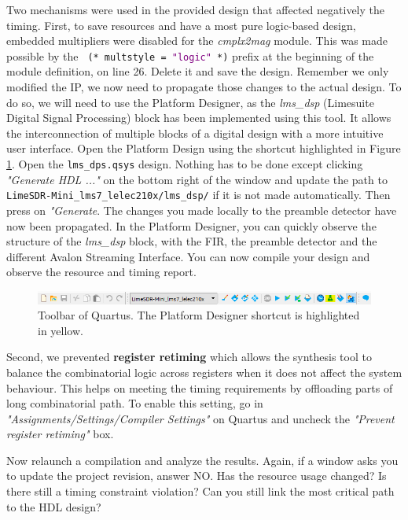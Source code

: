 Two mechanisms were used in the provided design that affected negatively the timing. First, to save resources and have a most pure logic-based design, embedded multipliers were disabled for the \textit{cmplx2mag} module. This was made possible by the \texttt{ (* multstyle = \textcolor{purple}{"logic"} *)} prefix at the beginning of the module definition, on line 26. Delete it and save the design. Remember we only modified the IP, we now need to propagate those changes to the actual design. To do so, we will need to use the Platform Designer, as the \textit{lms\_dsp} (Limesuite Digital Signal Processing) block has been implemented using this tool. It allows the interconnection of multiple blocks of a digital design with a more intuitive user interface. Open the Platform Design using the shortcut highlighted in Figure \ref{fig:quartus_platform_designer}. Open the \texttt{lms\_dps.qsys} design. Nothing has to be done except clicking \textit{"Generate HDL ..."} on the bottom right of the window and update the path to
\texttt{LimeSDR-Mini\_lms7\_lelec210x/lms\_dsp/} if it is not made automatically. Then press on \textit{"Generate}. The changes you made locally to the preamble detector have now been propagated. In the Platform Designer, you can quickly observe the structure of the \textit{lms\_dsp} block, with the FIR, the preamble detector and the different Avalon Streaming Interface. You can now compile your design and observe the resource and timing report.

\begin{figure}[H]
    \centering
    \includegraphics[scale=0.7]{figures/quartus_toolbar.PNG}
    \caption{Toolbar of Quartus. The Platform Designer shortcut is highlighted in yellow.}
    \label{fig:quartus_platform_designer}
\end{figure}

Second, we prevented \textbf{register retiming} which allows the synthesis tool to balance the combinatorial logic across registers when it does not affect the system behaviour. This helps on meeting the timing requirements by offloading parts of long combinatorial path. To enable this setting, go in \textit{"Assignments/Settings/Compiler Settings"} on Quartus and uncheck the \textit{"Prevent register retiming"} box.

Now relaunch a compilation and analyze the results. Again, if a window asks you to update the project revision, answer NO.  Has the resource usage changed? Is there still a timing constraint violation? Can you still link the most critical path to the HDL design?


